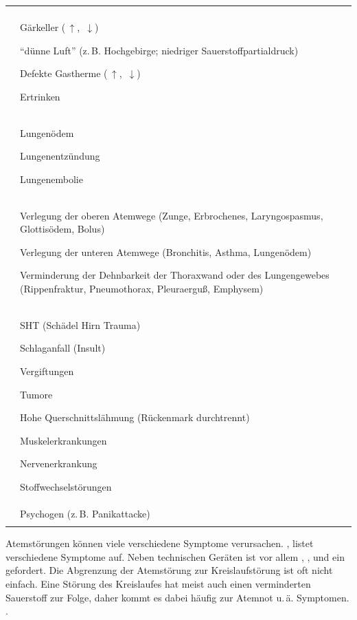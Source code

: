 \begin{table}[H]
\begin{WidePar}
\TableBaseModification
{}

\begin{tabulary}{\linewidth}[H]{LL}\addlinespace\toprule\addlinespace
\noindent{}  &
\noindent{}
\\\addlinespace\midrule\addlinespace
{}
 &
Gärkeller (\,${\uparrow}$, \,${\downarrow}$)

\enquote{dünne Luft} (z.\,B. Hochgebirge;
niedriger Sauerstoffpartialdruck)

Defekte Gastherme (\,${\uparrow}$,
\,${\downarrow}$)

Ertrinken
\\\addlinespace
{}
 &
Lungenödem

Lungenentzündung

Lungenembolie
\\\addlinespace
{}
 &
Verlegung der oberen Atemwege (Zunge, Erbrochenes, Laryngospasmus,
         Glottisödem, Bolus)

Verlegung der unteren Atemwege (Bronchitis, Asthma,
Lungenödem)

Verminderung der Dehnbarkeit der Thoraxwand oder des Lungengewebes
     (Rippenfraktur, Pneumothorax, Pleuraerguß, Emphysem)
\\\addlinespace
{}
 &
SHT (Schädel Hirn Trauma)

Schlaganfall (Insult)

Vergiftungen

Tumore

Hohe Querschnittslähmung (Rückenmark durchtrennt)

Muskelerkrankungen

Nervenerkrankung

Stoffwechselstörungen
\\\addlinespace
{}
 &
 Psychogen (z.\,B. Panikattacke)
\\\addlinespace\bottomrule
\end{tabulary}
\end{WidePar}
\end{table}


{%
Atemstörungen können viele verschiedene Symptome
verursachen. , listet
verschiedene Symptome auf. Neben technischen Geräten ist vor
allem ,
,  und ein 
gefordert.
Die Abgrenzung der Atemstörung zur Kreislaufstörung ist oft
nicht einfach. Eine Störung des Kreislaufes hat meist auch
einen verminderten Sauerstoff zur Folge, daher
kommt es dabei häufig  zur Atemnot u.\,ä. Symptomen.
}{.}{}{}{}


